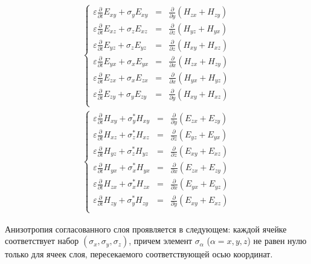 \begin{eqnarray}
\label{eq:pml13}
\left\{
\begin{array}{rcl}
  \varepsilon \frac{\partial}{\partial t}E_{xy} + \sigma_y E_{xy} & = & \frac{\partial}{\partial y}(H_{zx}+H_{zy}) \\
  \varepsilon \frac{\partial}{\partial t}E_{xz} + \sigma_z E_{xz} & = & \frac{\partial}{\partial z}(H_{yz}+H_{yx}) \\
  \varepsilon \frac{\partial}{\partial t}E_{yz} + \sigma_z E_{yz} & = & \frac{\partial}{\partial z}(H_{xy}+H_{xz}) \\
  \varepsilon \frac{\partial}{\partial t}E_{yx} + \sigma_x E_{yx} & = & \frac{\partial}{\partial x}(H_{zx}+H_{zy}) \\
  \varepsilon \frac{\partial}{\partial t}E_{zx} + \sigma_x E_{zx} & = & \frac{\partial}{\partial x}(H_{yx}+H_{yz}) \\
  \varepsilon \frac{\partial}{\partial t}E_{zy} + \sigma_y E_{zy} & = & \frac{\partial}{\partial y}(H_{xy}+H_{xz}) \\
\end{array}
\right.
  \\ %
\left\{
\begin{array}{rcl}
  \varepsilon \frac{\partial}{\partial t}H_{xy} + \sigma_y^* H_{xy} & = & \frac{\partial}{\partial y}(E_{zx}+E_{zy}) \\
  \varepsilon \frac{\partial}{\partial t}H_{xz} + \sigma_z^* H_{xz} & = & \frac{\partial}{\partial z}(E_{yz}+E_{yx}) \\
  \varepsilon \frac{\partial}{\partial t}H_{yz} + \sigma_z^* H_{yz} & = & \frac{\partial}{\partial z}(E_{xy}+E_{xz}) \\
  \varepsilon \frac{\partial}{\partial t}H_{yx} + \sigma_x^* H_{yx} & = & \frac{\partial}{\partial x}(E_{zx}+E_{zy}) \\
  \varepsilon \frac{\partial}{\partial t}H_{zx} + \sigma_x^* H_{zx} & = & \frac{\partial}{\partial x}(E_{yx}+E_{yz}) \\
  \varepsilon \frac{\partial}{\partial t}H_{zy} + \sigma_y^* H_{zy} & = & \frac{\partial}{\partial y}(E_{xy}+E_{xz}) \\
\end{array}
\right.
\end{eqnarray}

Анизотропия согласованного слоя проявляется в следующем: каждой ячейке соответствует набор $(\sigma_x,\sigma_y,\sigma_z)$, причем элемент $\sigma_\alpha$ ($\alpha={x,y,z}$) не равен нулю только для ячеек слоя, пересекаемого соответствующей осью координат.


